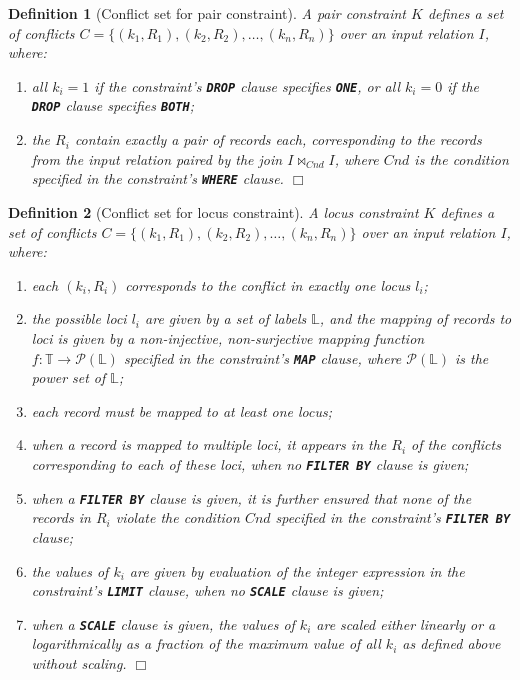 \documentclass[11pt, oneside]{report}
\newtheorem{definition}{Definition}
\newcommand{\mathendbox}{\hfill$\Box$}
\begin{document}
{\begin{definition}[Conflict set for pair constraint]
A pair constraint $K$ defines a set of conflicts $C = \{ (k_1, R_1), (k_2, R_2), \ldots, (k_n, R_n) \}$ over an input relation $I$, where:
\begin{enumerate}[label=(\alph*)]
\item all $k_i = 1$ if the constraint's \textbf{\texttt{DROP}} clause specifies \textbf{\texttt{ONE}}, or all $k_i = 0$ if the \textbf{\texttt{DROP}} clause specifies \textbf{\texttt{BOTH}};
\item the $R_i$ contain exactly a pair of records each, corresponding to the records from the input relation paired by the join $I \bowtie_{Cnd} I$, where $Cnd$ is the condition specified in the constraint's \textbf{\texttt{WHERE}} clause. \mathendbox
\end{enumerate}   
\label{def:conflict:set:pair}
\end{definition} 

\begin{definition}[Conflict set for locus constraint]
A locus constraint $K$ defines a set of conflicts $C = \{ (k_1, R_1), (k_2, R_2), \ldots, (k_n, R_n) \}$ over an input relation $I$, where:
\begin{enumerate}[label=(\alph*)]
\item each $(k_i, R_i)$ corresponds to the conflict in exactly one locus $l_i$;
\item the possible loci $l_i$ are given by a set of labels $\mathbb{L}$, and the mapping of records to loci is given by a non-injective, non-surjective mapping function $f: \mathbb{T} \rightarrow \mathcal P (\mathbb{L})$ specified in the constraint's \textbf{\texttt{MAP}} clause, where $\mathcal P (\mathbb{L})$ is the power set of $\mathbb{L}$;
\item each record must be mapped to at least one locus;
\item when a record is mapped to multiple loci, it appears in the $R_i$ of the conflicts corresponding to each of these loci, when no \textbf{\texttt{FILTER BY}} clause is given;
\item when a \textbf{\texttt{FILTER BY}} clause is given, it is further ensured that none of the records in $R_i$ violate the condition $Cnd$ specified in the constraint's \textbf{\texttt{FILTER BY}} clause;
\item the values of $k_i$ are given by evaluation of the integer expression in the constraint's \textbf{\texttt{LIMIT}} clause, when no \textbf{\texttt{SCALE}} clause is given;
\item when a \textbf{\texttt{SCALE}} clause is given, the values of $k_i$ are scaled either linearly or a logarithmically as a fraction of the maximum value of all $k_i$ as defined above without scaling. 
\mathendbox 
\end{enumerate}
\label{def:conflict:set:locus}
\end{definition} 
 
}
\end{document}
